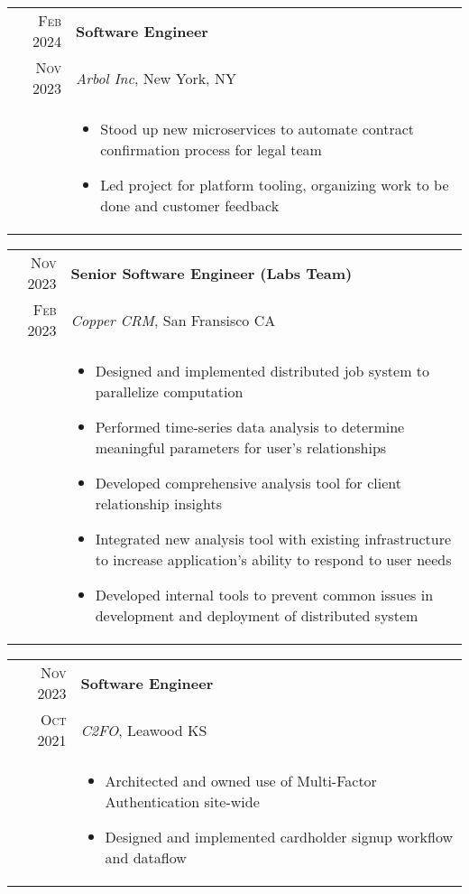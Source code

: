 \documentclass[a4paper,10pt]{article}
\begin{document}
\begin{tabular}{r|p{15cm}}
  \textsc{Feb 2024}  & \textbf{Software Engineer} \\
  \textsc{Nov 2023} & \textit{Arbol Inc}, New York, NY
  \\ &  
       \begin{itemize}
       \item Stood up new microservices to automate contract confirmation process for legal team
       \item Led project for platform tooling, organizing work to be done and customer feedback
       \end{itemize} \\
\end{tabular}

\begin{tabular}{r|p{15cm}}
  \textsc{Nov 2023}  & \textbf{Senior Software Engineer (Labs Team)} \\
  \textsc{Feb 2023} & \textit{Copper CRM}, San Fransisco CA
  \\ &  
       \begin{itemize}
       \item Designed and implemented distributed job system to parallelize computation
       \item Performed time-series data analysis to determine meaningful parameters for user's relationships
       \item Developed comprehensive analysis tool for client relationship insights
       \item Integrated new analysis tool with existing infrastructure to increase application's ability to respond to user needs
       \item Developed internal tools to prevent common issues in development and deployment of distributed system
       \end{itemize} \\
\end{tabular}

\begin{tabular}{r|p{15cm}}
  \textsc{Nov 2023} & \textbf{Software Engineer} \\
  \textsc{Oct 2021} & \textit{C2FO}, Leawood KS
  \\ &  
       \begin{itemize}
       \item Architected and owned use of Multi-Factor Authentication site-wide
       \item Designed and implemented cardholder signup workflow and dataflow
       \end{itemize} \\
\end{tabular}
\end{document}
